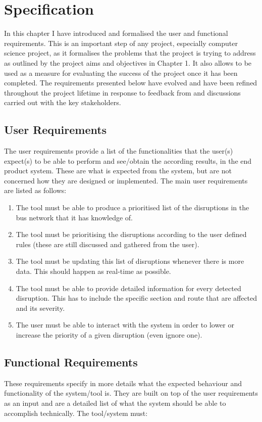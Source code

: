 \chapter{Specification}
In this chapter I have introduced and formalised the user and functional requirements.
This is an important step of any project, especially computer science project, as it formalises the problems that the project is trying to address as outlined by the project aims and objectives in Chapter 1. It also allows to be used as a measure for evaluating the success of the project once it has been completed. The requirements presented below have evolved and have been refined throughout the project lifetime in response to feedback from and discussions carried out with the key stakeholders.

\section{User Requirements}
The user requirements provide a list of the functionalities that the user(s) expect(s) to be able to perform and see/obtain the according results, in the end product system. These are what is expected from the system, but are not concerned how they are designed or implemented. The main user requirements are listed as follows:

\begin{enumerate}
	\item The tool must be able to produce a prioritised list of the disruptions in
the bus network that it has knowledge of.
	\item The tool must be prioritising the disruptions according to the user defined
rules (these are still discussed and gathered from the user).
	\item The tool must be updating this list of disruptions whenever there is more
data. This should happen as real-time as possible.
	\item The tool must be able to provide detailed information for every detected disruption. This has to include the specific section and route that are affected and its severity.
	\item The user must be able to interact with the system in order to lower or
increase the priority of a given disruption (even ignore one).
\end{enumerate}

\section{Functional Requirements}
These requirements specify in more details what the expected behaviour and functionality of the system/tool is. They are built on top of the user requirements as an input and are a detailed list of what the system should be able to accomplish technically. The tool/system must:

